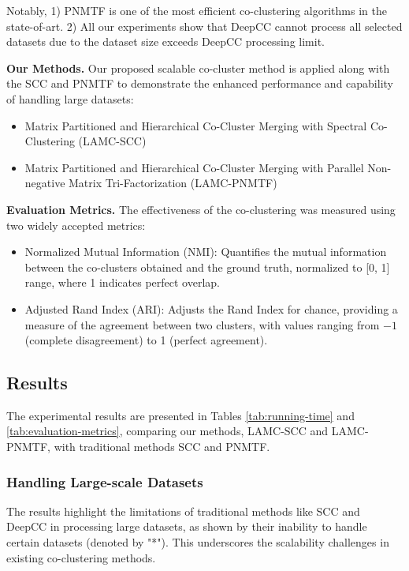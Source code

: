 Notably, 1) PNMTF is one of the most efficient co-clustering algorithms in the state-of-art. 2) All our experiments show that DeepCC cannot process all selected datasets due to the dataset size exceeds DeepCC processing limit.

\textbf{Our Methods.} Our proposed scalable co-cluster method is applied along with the SCC and PNMTF to demonstrate the enhanced performance and capability of handling large datasets:
\begin{itemize}
    \item Matrix Partitioned and Hierarchical Co-Cluster Merging with Spectral Co-Clustering (LAMC-SCC)
    \item Matrix Partitioned and Hierarchical Co-Cluster Merging with Parallel Non-negative Matrix Tri-Factorization (LAMC-PNMTF)
\end{itemize}

\textbf{Evaluation Metrics.}
The effectiveness of the co-clustering was measured using two widely accepted metrics:

\begin{itemize}
    \item Normalized Mutual Information (NMI): Quantifies the mutual information between the co-clusters obtained and the ground truth, normalized to [0, 1] range, where 1 indicates perfect overlap.
    \item Adjusted Rand Index (ARI): Adjusts the Rand Index for chance, providing a measure of the agreement between two clusters, with values ranging from $-1$ (complete disagreement) to 1 (perfect agreement).
\end{itemize}

\subsection{Results}
The experimental results are presented in Tables \ref{tab:running-time} and \ref{tab:evaluation-metrics}, comparing our methods, LAMC-SCC and LAMC-PNMTF, with traditional methods SCC and PNMTF.

\subsubsection{Handling Large-scale Datasets} The results highlight the limitations of traditional methods like SCC and DeepCC in processing large datasets, as shown by their inability to handle certain datasets (denoted by "*"). This underscores the scalability challenges in existing co-clustering methods.

